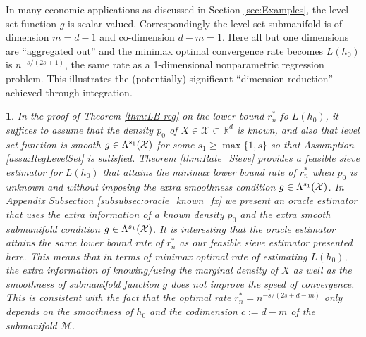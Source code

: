 \documentclass[12pt,american]{article}
\theoremstyle{definition}
\theoremstyle{plain}
\theoremstyle{definition}
\theoremstyle{plain}
\theoremstyle{plain}
\theoremstyle{plain}
\theoremstyle{plain}
\newtheorem{rem}{\protect\remarkname}
\theoremstyle{plain}
\newcommand{\R}{\mathbb{R}}
\providecommand{\remarkname}{Remark}
\begin{document}
In many economic applications as discussed in Section \ref{sec:Examples}, the level set function $g$ is scalar-valued. Correspondingly the level set submanifold is of dimension $m=d-1$ and co-dimension $d-m = 1$. Here all but one dimensions are ``aggregated out'' and the minimax optimal convergence rate becomes $L(h_0)$ is $n^{-s/(2s+1)}$,  the same rate as a 1-dimensional nonparametric regression problem. This illustrates the (potentially) significant ``dimension reduction'' achieved through integration.

%

\begin{rem}
  In the proof of Theorem \ref{thm:LB-reg} on the lower bound $r^*_n$ fo $L(h_0)$, it suffices to assume that the density $p_0$ of $X\in \mathcal{X}\subset \R^d$ is known, and also that level set function is smooth $g\in \Lambda^{s_1}({\cal X})$ for some $s_1 \geq \max\{1,s\}$ so that Assumption \ref{assu:RegLevelSet} is satisfied. Theorem \ref{thm:Rate_Sieve} provides a feasible sieve estimator for $L(h_0)$ that attains the minimax lower bound rate of $r^*_n$ when $p_0$ is unknown and without imposing the extra smoothness condition $g\in \Lambda^{s_1}({\cal X})$. In Appendix Subsection \ref{subsubsec:oracle_known_fx} we present an oracle estimator that uses the extra information of a known density $p_0$ and the extra smooth submanifold condition $g\in \Lambda^{s_1}({\cal X})$. It is interesting that the oracle estimator attains the same lower bound rate of $r^*_n$ as our feasible sieve estimator presented here. This means that in terms of minimax optimal rate of estimating $L(h_0)$, the extra information of knowing/using the marginal density of $X$ as well as the smoothness of submanifold function $g$ does not improve the speed of convergence. This is consistent with the fact that the optimal rate $r^*_n=n^{-s/(2s+d-m)}$ only depends on the smoothness of $h_0$ and the codimension $c:=d-m$ of the submanifold $\mathcal{M}$.
\end{rem}
\end{document}
